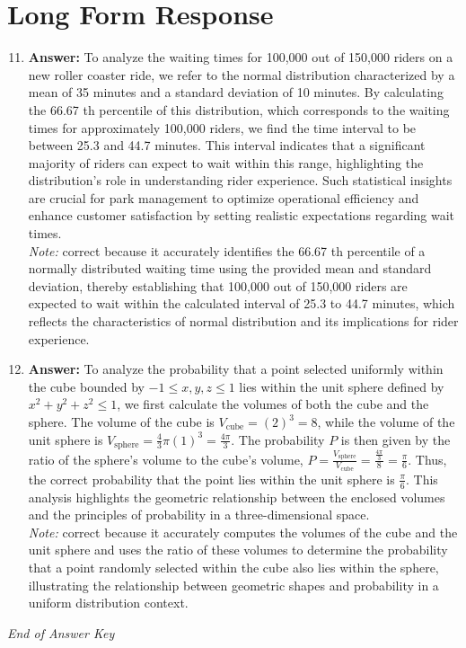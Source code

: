 \documentclass[12pt]{article}
\begin{document}
\section*{Long Form Response}
\begin{enumerate}[label=\arabic*.]
\setcounter{enumi}{10}
\item \textbf{Answer:} To analyze the waiting times for 100,000 out of 150,000 riders on a new roller coaster ride, we refer to the normal distribution characterized by a mean of 35 minutes and a standard deviation of 10 minutes. By calculating the 66.67 th percentile of this distribution, which corresponds to the waiting times for approximately 100,000 riders, we find the time interval to be between 25.3 and 44.7 minutes. This interval indicates that a significant majority of riders can expect to wait within this range, highlighting the distribution's role in understanding rider experience. Such statistical insights are crucial for park management to optimize operational efficiency and enhance customer satisfaction by setting realistic expectations regarding wait times.
\\ \textit{Note:} correct because it accurately identifies the 66.67 th percentile of a normally distributed waiting time using the provided mean and standard deviation, thereby establishing that 100,000 out of 150,000 riders are expected to wait within the calculated interval of 25.3 to 44.7 minutes, which reflects the characteristics of normal distribution and its implications for rider experience.
\item \textbf{Answer:} To analyze the probability that a point selected uniformly within the cube bounded by \(-1 \leq x, y, z \leq 1\) lies within the unit sphere defined by \(x^2 + y^2 + z^2 \leq 1\), we first calculate the volumes of both the cube and the sphere. The volume of the cube is \(V_{\text{cube}} = (2)^3 = 8\), while the volume of the unit sphere is \(V_{\text{sphere}} = \frac{4}{3} \pi (1)^3 = \frac{4\pi}{3}\). The probability \(P\) is then given by the ratio of the sphere's volume to the cube's volume, \(P = \frac{V_{\text{sphere}}}{V_{\text{cube}}} = \frac{\frac{4\pi}{3}}{8} = \frac{\pi}{6}\). Thus, the correct probability that the point lies within the unit sphere is \(\frac{\pi}{6}\). This analysis highlights the geometric relationship between the enclosed volumes and the principles of probability in a three-dimensional space.
\\ \textit{Note:} correct because it accurately computes the volumes of the cube and the unit sphere and uses the ratio of these volumes to determine the probability that a point randomly selected within the cube also lies within the sphere, illustrating the relationship between geometric shapes and probability in a uniform distribution context.
\end{enumerate}

\vfill
\noindent\textit{End of Answer Key}
\end{document}
